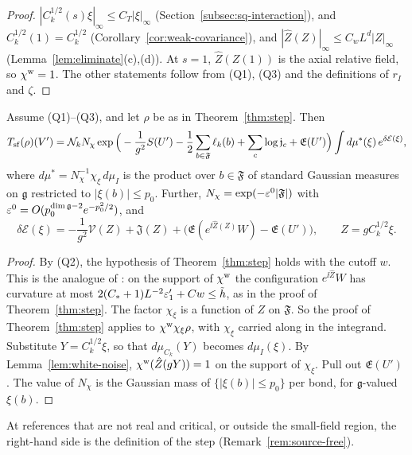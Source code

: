 \begin{proof}
$|C_k^{1/2}(s)\xi|_\infty\le C_T|\xi|_\infty$ (Section~\ref{subsec:sq-interaction}), and $C_k^{1/2}(1)=C_k^{1/2}$ (Corollary~\ref{cor:weak-covariance}), and $|\hat Z(Z)|_\infty\le C_wL^d|Z|_\infty$ (Lemma~\ref{lem:eliminate}(c),(d)). At $s=1$, $\hat Z(Z(1))$ is the axial relative field, so $\chi^{\rm w}=1$. The other statements follow from (Q1), (Q3) and the definitions of $r_I$ and $\zeta$.
\end{proof}

\begin{proposition}\label{prop:small-field-step}
Assume (Q1)--(Q3), and let $\rho$ be as in Theorem~\ref{thm:step}. Then
\[
T_{\rm sf}(\rho)(V')=\mathcal N_kN_\chi\exp\Big(-\frac1{g^2}S(U')-\frac12\sum_{b\in\mathfrak F}\ell_k(b)+\sum_c\log\mathfrak j_c+\mathfrak E(U')\Big)\int d\mu^*(\xi)\,e^{\delta\mathcal E(\xi)},
\]
where $d\mu^*=N_\chi^{-1}\chi_\xi\,d\mu_I$ is the product over $b\in\mathfrak F$ of standard Gaussian measures on $\mathfrak g$ restricted to $|\xi(b)|\le p_0$. Further, $N_\chi=\exp(-\varepsilon^0|\mathfrak F|)$ with $\varepsilon^0=O(p_0^{\dim\mathfrak g-2}e^{-p_0^2/2})$, and
\[
\delta\mathcal E(\xi)=-\frac1{g^2}\mathcal V(Z)+\mathfrak J(Z)+\big(\mathfrak E(e^{\ii\hat Z(Z)}W)-\mathfrak E(U')\big),\qquad Z=gC_k^{1/2}\xi .
\]
\end{proposition}

\begin{proof}
By (Q2), the hypothesis of Theorem~\ref{thm:step} holds with the cutoff $w$. This is the analogue of \cite[Lemma~15]{DimockI}: on the support of $\chi^{\rm w}$ the configuration $e^{\ii\hat Z}W$ has curvature at most $2(C_*+1)L^{-2}\varepsilon'_1+Cw\le\tilde h$, as in the proof of Theorem~\ref{thm:step}. The factor $\chi_\xi$ is a function of $Z$ on $\mathfrak F$. So the proof of Theorem~\ref{thm:step} applies to $\chi^{\rm w}\chi_\xi\rho$, with $\chi_\xi$ carried along in the integrand. Substitute $Y=C_k^{1/2}\xi$, so that $d\mu_{C_k}(Y)$ becomes $d\mu_I(\xi)$. By Lemma~\ref{lem:white-noise}, $\chi^{\rm w}(\hat Z(gY))=1$ on the support of $\chi_\xi$. Pull out $\mathfrak E(U')$ \cite[(211)--(212)]{DimockI}. The value of $N_\chi$ is the Gaussian mass of $\{|\xi(b)|\le p_0\}$ per bond, for $\mathfrak g$-valued $\xi(b)$.
\end{proof}

At references that are not real and critical, or outside the small-field region, the right-hand side is the definition of the step (Remark~\ref{rem:source-free}).


